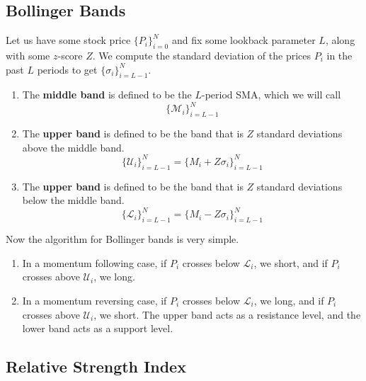 \documentclass{article}
\begin{document}
  \subsection{Bollinger Bands}

    \begin{definition}
      \label{def:bollinger-bands}
      Let us have some stock price $\{P_i\}_{i=0}^N$ and fix some lookback parameter $L$, along with some $z$-score $Z$. We compute the standard deviation of the prices $P_i$ in the past $L$ periods to get $\{\sigma_i\}_{i=L-1}^N$. 
      \begin{enumerate}
        \item The \textbf{middle band} is defined to be the $L$-period SMA, which we will call 
        \begin{equation}
          \{\mathcal{M}_i\}_{i=L-1}^N
        \end{equation}
         
        \item The \textbf{upper band} is defined to be the band that is $Z$ standard deviations above the middle band. 
        \begin{equation}
          \{\mathcal{U}_i\}_{i=L-1}^N = \{M_i + Z \sigma_i\}_{i=L-1}^N
        \end{equation}
        \item The \textbf{upper band} is defined to be the band that is $Z$ standard deviations below the middle band. 
        \begin{equation}
          \{\mathcal{L}_i\}_{i=L-1}^N = \{M_i - Z \sigma_i\}_{i=L-1}^N
        \end{equation}
      \end{enumerate}
    \end{definition}

    Now the algorithm for Bollinger bands is very simple. 
    \begin{enumerate}
      \item In a momentum following case, if $P_i$ crosses below $\mathcal{L}_i$, we short, and if $P_i$ crosses above $\mathcal{U}_i$, we long. 

      \item In a momentum reversing case, if $P_i$ crosses below $\mathcal{L}_i$, we long, and if $P_i$ crosses above $\mathcal{U}_i$, we short. The upper band acts as a resistance level, and the lower band acts as a support level. 
    \end{enumerate}

  \subsection{Relative Strength Index}
\end{document}
